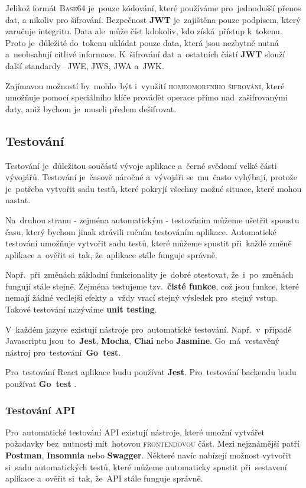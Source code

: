 \documentclass[14pt,a4paper]{article}
\begin{document}
            Jelikož formát \textsc{Base64} je~pouze kódování, které používáme pro~jednodušší přenos dat, a nikoliv pro šifrování. Bezpečnost \textbf{JWT} je~zajištěna pouze podpisem, který zaručuje integritu. Data ale~může číst kdokoliv, kdo získá~přístup k~tokenu. Proto je~důležité do~tokenu ukládat pouze data, která jsou nezbytně nutná a~neobsahují citlivé informace. K~šifrování dat a~ostatních částí \textbf{JWT} slouží další standardy\,--\,\textsc{JWE}, \textsc{JWS}, \textsc{JWA} a~\textsc{JWK}. \parencite{jwtesak}

            Zajímavou možností by~mohlo~být i~využití \textsc{homeomorfního šifrování}, které umožňuje pomocí speciálního klíče provádět operace přímo nad~zašifrovanými daty, aniž bychom je~museli předem dešifrovat. \parencite{homeomorphicEncryption}


        \subsection{Testování}
        Testování je~důležitou součástí vývoje aplikace a~černé svědomí velké části vývojářů. Testování je~časově náročné a~vývojáři se~mu~často vyhýbají, protože je~potřeba vytvořit sadu testů, které pokryjí všechny možné situace, které mohou nastat.
        
        Na~druhou stranu - zejména automatickým - testováním můžeme ušetřit spoustu času, který bychom jinak strávili ručním testováním aplikace. Automatické testování umožňuje vytvořit sadu testů, které můžeme spustit při~každé změně aplikace a~ověřit si~tak, že~aplikace stále funguje správně.
        
        Např.~při~změnách základní funkcionality je~dobré otestovat, že~i~po~změnách fungují stále stejně. Zejména testujeme tzv.~\textbf{čisté funkce}, což jsou funkce, které nemají žádné vedlejší efekty a~vždy vrací stejný výsledek pro~stejný vstup. Takové testování nazýváme \textbf{unit testing}.
        
        V~každém jazyce existují nástroje pro~automatické testování. Např.~v~případě Javascriptu jsou~to~\textbf{Jest}, \textbf{Mocha}, \textbf{Chai} nebo \textbf{Jasmine}. Go~má~vestavěný nástroj pro~testování~\textbf{Go~test}.
        
        Pro~testování React aplikace budu používat \textbf{Jest}. Pro~testování backendu budu používat \textbf{Go~test} \parencite{jestjsTestingReact}.
        
        \subsubsection{Testování API}
        Pro~automatické testování API existují nástroje, které umožní vytvářet požadavky bez~nutnosti mít~hotovou \textsc{frontendovou} část. Mezi nejznámější patří \textbf{Postman}, \textbf{Insomnia} nebo \textbf{Swagger}. Některé navíc nabízejí možnost vytvořit si~sadu automatických testů, které můžeme automaticky spustit při~sestavení aplikace a~ověřit si~tak, že~API stále funguje správně.
\end{document}
